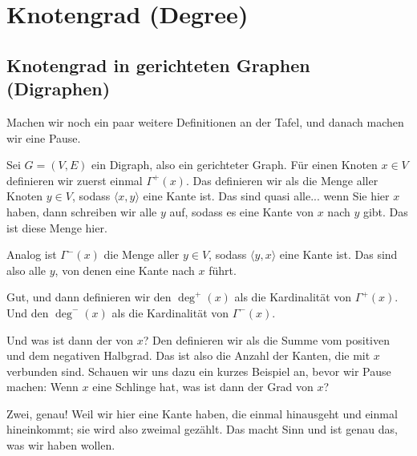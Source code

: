 \section{Knotengrad (Degree)}
\subsection{Knotengrad in gerichteten Graphen (Digraphen)}

\begin{spoken-clean}[00:39:52 - 00:42:57]
Machen wir noch ein paar weitere Definitionen an der Tafel, und danach machen wir eine Pause.

Sei $G = (V, E)$ ein Digraph, also ein gerichteter Graph. Für einen Knoten $x \in V$ definieren wir zuerst einmal $\Gamma^+(x)$. Das definieren wir als die Menge aller Knoten $y \in V$, sodass $\langle x, y \rangle$ eine Kante ist. Das sind quasi alle... wenn Sie hier $x$ haben, dann schreiben wir alle $y$ auf, sodass es eine Kante von $x$ nach $y$ gibt. Das ist diese Menge hier.

Analog ist $\Gamma^-(x)$ die Menge aller $y \in V$, sodass $\langle y, x \rangle$ eine Kante ist. Das sind also alle $y$, von denen eine Kante nach $x$ führt.

Gut, und dann definieren wir den  $\deg^+(x)$ als die Kardinalität von $\Gamma^+(x)$. Und den  $\deg^-(x)$ als die Kardinalität von $\Gamma^-(x)$.
\end{spoken-clean}

\begin{spoken-clean}[00:42:57 - 00:45:02]
Und was ist dann der  von $x$? Den definieren wir als die Summe vom positiven und dem negativen Halbgrad. Das ist also die Anzahl der Kanten, die mit $x$ verbunden sind. Schauen wir uns dazu ein kurzes Beispiel an, bevor wir Pause machen: Wenn $x$ eine Schlinge hat, was ist dann der Grad von $x$?

Zwei, genau! Weil wir hier eine Kante haben, die einmal hinausgeht und einmal hineinkommt; sie wird also zweimal gezählt. Das macht Sinn und ist genau das, was wir haben wollen.
\end{spoken-clean}


